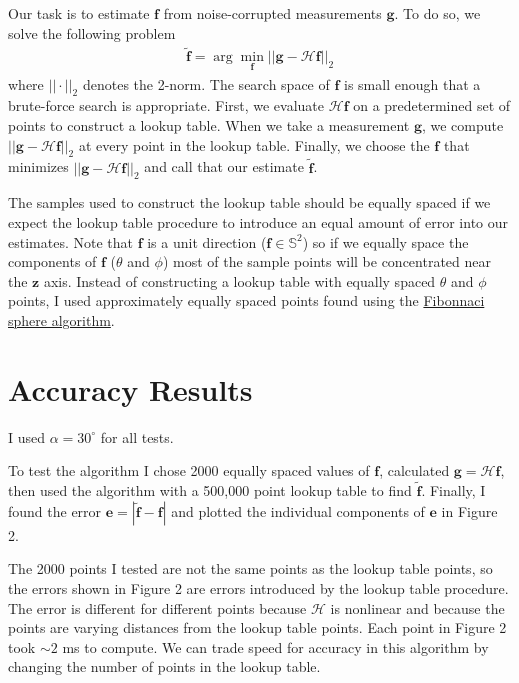 \documentclass[11pt]{article}
\newcommand{\argmin}{\arg\!\min}
\providecommand{\mb}[1]{\mathbf{#1}}
\begin{document}
Our task is to estimate $\mb{f}$ from noise-corrupted measurements $\mb{g}$. To
do so, we solve the following problem
\begin{align}
  \tilde{\mb{f}} = \argmin_{\mb{f}} ||\mb{g} - \mathcal{H}\mb{f}||_2 \label{eq:problem}
\end{align}
where $||\cdot||_2$ denotes the 2-norm. The search space of $\mb{f}$ is small
enough that a brute-force search is appropriate. First, we evaluate
$\mathcal{H}\mb{f}$ on a predetermined set of points to construct a lookup
table. When we take a measurement $\mb{g}$, we compute
$||\mb{g} - \mathcal{H}\mb{f}||_2$ at every point in the lookup table. Finally,
we choose the $\mb{f}$ that minimizes $||\mb{g} - \mathcal{H}\mb{f}||_2$ and
call that our estimate $\tilde{\mb{f}}$.

The samples used to construct the lookup table should be equally spaced if we
expect the lookup table procedure to introduce an equal amount of error into our
estimates. Note that $\mb{f}$ is a unit direction ($\mb{f}\in \mathbb{S}^2$) so
if we equally space the components of $\mb{f}$ ($\theta$ and $\phi$) most of the
sample points will be concentrated near the $\mb{z}$ axis. Instead of
constructing a lookup table with equally spaced $\theta$ and $\phi$ points, I
used approximately equally spaced points found using the
\href{http://stackoverflow.com/a/26127012/5854689}{Fibonnaci sphere algorithm}.

\section{Accuracy Results}
I used $\alpha = 30^{\circ}$ for all tests.

To test the algorithm I chose 2000 equally spaced values of $\mb{f}$, calculated
$\mb{g} = \mathcal{H}\mb{f}$, then used the algorithm with a 500,000 point
lookup table to find $\tilde{\mb{f}}$. Finally, I found the error
$\mb{e} = |\tilde{\mb{f}} - \mb{f}|$ and plotted the individual components of
$\mb{e}$ in Figure 2.

The 2000 points I tested are not the same points as the lookup table points, so
the errors shown in Figure 2 are errors introduced by the lookup table
procedure. The error is different for different points because $\mathcal{H}$ is
nonlinear and because the points are varying distances from the lookup table
points. Each point in Figure 2 took $\sim 2$ ms to compute. We can trade speed
for accuracy in this algorithm by changing the number of points in the lookup
table.
\end{document}
